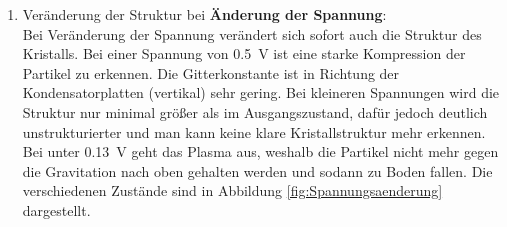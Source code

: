 \documentclass[12pt,a4paper,ngerman]{article}
\begin{document}
\begin{enumerate}[font=\bfseries]
\begin{enumerate}[font=\bfseries, label=\alph*)]
			\item Veränderung der Struktur bei \textbf{Änderung der Spannung}: \\
			Bei Veränderung der Spannung verändert sich sofort auch die Struktur des Kristalls. Bei einer Spannung von \qty{0.5}{\volt} ist eine starke Kompression der Partikel zu erkennen. Die Gitterkonstante ist in Richtung der Kondensatorplatten (vertikal) sehr gering. Bei kleineren Spannungen wird die Struktur nur minimal größer als im Ausgangszustand, dafür jedoch deutlich unstrukturierter und man kann keine klare Kristallstruktur mehr erkennen. Bei unter \qty{0.13}{\volt} geht das Plasma aus, weshalb die Partikel nicht mehr gegen die Gravitation nach oben gehalten werden und sodann zu Boden fallen. Die verschiedenen Zustände sind in Abbildung \ref{fig:Spannungsaenderung} dargestellt.
		\end{enumerate}
			
	\end{enumerate}
	
\end{document}
